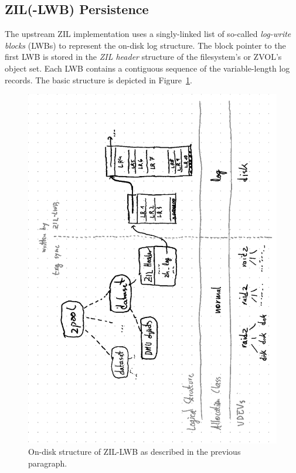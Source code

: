 \documentclass[12pt,a4paper,twoside]{book}
\begin{document}
\subsection{ZIL(-LWB) Persistence}\label{ch:openzfs_background:zillwb_persistence}

The upstream ZIL implementation uses a singly-linked list of so-called \textit{log-write blocks} (LWBs) to represent the on-disk log structure.
The block pointer to the first LWB is stored in the \textit{ZIL header} structure of the filesystem's or ZVOL's object set.
Each LWB contains a contiguous sequence of the variable-length log records.
The basic structure is depicted in Figure~\ref{fig:zil_lwb__physical_structure_overview}.

\begin{figure}[H]
    \centering
    \includegraphics[trim=0cm 0.3cm 0cm 0.3cm, clip]{fig/zil_lwb__physical_structure_overview}
    \caption{On-disk structure of ZIL-LWB as described in the previous paragraph.}
    \label{fig:zil_lwb__physical_structure_overview}
\end{figure}
\end{document}
